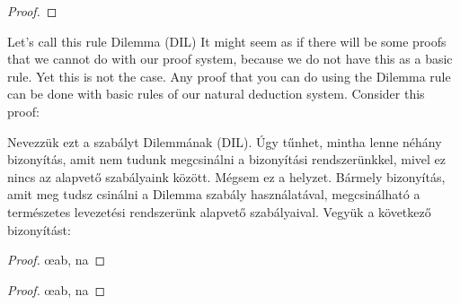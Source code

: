 \begin{proof}
	 
\end{proof}

Let's call this rule Dilemma (DIL) It might seem as if there will be some proofs that we cannot do with our proof system, because we do not have this as a basic rule. Yet this is not the case. Any proof that you can do using the Dilemma rule can be done with basic rules of our natural deduction system. Consider this proof:

Nevezzük ezt a szabályt Dilemmának (DIL). Úgy tűnhet, mintha lenne néhány bizonyítás, amit nem tudunk megcsinálni a bizonyítási rendszerünkkel, mivel ez nincs az alapvető szabályaink között. Mégsem ez a helyzet. Bármely bizonyítás, amit meg tudsz csinálni a Dilemma szabály használatával, megcsinálható a természetes levezetési rendszerünk alapvető szabályaival. Vegyük a következő bizonyítást:

\begin{proof}
	\open
		\open
		\close
		\open
		\close
		\oe{ab, na}
	\close
	 
\end{proof}

\begin{proof}
	\open
		\open
		\close
		\open
		\close
		\oe{ab, na}
	\close
	 
\end{proof}

